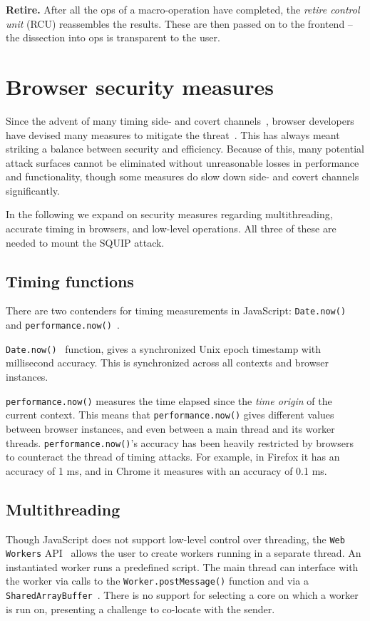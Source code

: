 \documentclass[11pt,
  titlepage=false,
]{scrreprt}
\begin{document}
\textbf{Retire.}
After all the \textmu ops of a macro-operation have completed, the \textit{retire control unit} (RCU) reassembles the results.
These are then passed on to the frontend -- the dissection into \textmu ops is transparent to the user.


\section{Browser security measures}
\label{sec:browsersecurity}
Since the advent of many timing side- and covert channels~\cite{noack2018exploiting, Rokicki2022webport, gruss2016rowhammer}, browser developers have devised many measures to mitigate the threat~\cite{shusterman2021prime}.
This has always meant striking a balance between security and efficiency.
Because of this, many potential attack surfaces cannot be eliminated without unreasonable losses in performance and functionality, though some measures do slow down side- and covert channels significantly.

In the following we expand on security measures regarding multithreading, accurate timing in browsers, and low-level operations.
All three of these are needed to mount the SQUIP attack.


\subsection{Timing functions}\label{subsec:timingjs}
There are two contenders for timing measurements in JavaScript: \texttt{Date.now()}~\cite{datenow} and \texttt{performance.now()}~\cite{performancenow}.

\texttt{Date.now()}~\cite{datenow} function, gives a synchronized Unix epoch timestamp with millisecond accuracy.
This is synchronized across all contexts and browser instances.

\texttt{performance.now()} measures the time elapsed since the \textit{time origin} of the current context.
This means that \texttt{performance.now()} gives different values between browser instances, and even between a main thread and its worker threads.
\texttt{performance.now()}'s accuracy has been heavily restricted by browsers to counteract the thread of timing attacks.
For example, in Firefox it has an accuracy of 1 ms, and in Chrome it measures with an accuracy of 0.1 ms.

\subsection{Multithreading}\label{subsec:multithreading}
Though JavaScript does not support low-level control over threading, the \texttt{Web Workers} API~\cite{webworkers} allows the user to create workers running in a separate thread.
An instantiated worker runs a predefined script.
The main thread can interface with the worker via calls to the \texttt{Worker.postMessage()} function and via a \texttt{SharedArrayBuffer}~\cite{sharedarraybuffer}.
There is no support for selecting a core on which a worker is run on, presenting a challenge to co-locate with the sender.
\end{document}
